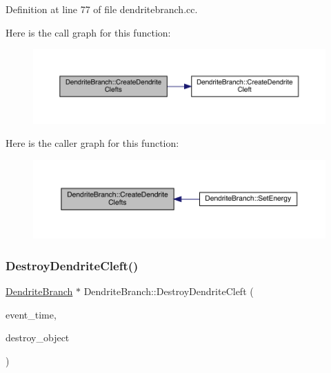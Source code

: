 Definition at line 77 of file dendritebranch.\+cc.

Here is the call graph for this function\+:
\nopagebreak
\begin{figure}[H]
\begin{center}
\leavevmode
\includegraphics[width=350pt]{class_dendrite_branch_a86d00d6ad66c8c83683e9e22d73a71b6_cgraph}
\end{center}
\end{figure}
Here is the caller graph for this function\+:
\nopagebreak
\begin{figure}[H]
\begin{center}
\leavevmode
\includegraphics[width=350pt]{class_dendrite_branch_a86d00d6ad66c8c83683e9e22d73a71b6_icgraph}
\end{center}
\end{figure}
\mbox{\label{class_dendrite_branch_a60225ab106eae6bce25eb8159166d5e9}} 
\subsubsection{\texorpdfstring{Destroy\+Dendrite\+Cleft()}{DestroyDendriteCleft()}}
{\footnotesize\ttfamily \hyperlink{class_dendrite_branch}{Dendrite\+Branch} $\ast$ Dendrite\+Branch\+::\+Destroy\+Dendrite\+Cleft (\begin{DoxyParamCaption}\item[{std\+::chrono\+::time\+\_\+point$<$ \hyperlink{universe_8h_a0ef8d951d1ca5ab3cfaf7ab4c7a6fd80}{Clock} $>$}]{event\+\_\+time,  }\item[{\hyperlink{class_dendrite_branch}{Dendrite\+Branch} $\ast$}]{destroy\+\_\+object }\end{DoxyParamCaption})}



